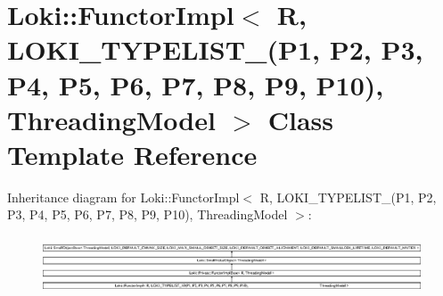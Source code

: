 \hypertarget{classLoki_1_1FunctorImpl_3_01R_00_01LOKI__TYPELIST__10_07P1_00_01P2_00_01P3_00_01P4_00_01P5_00_0411efd7e1763d854e78c97db5e851b87}{}\section{Loki\+:\+:Functor\+Impl$<$ R, L\+O\+K\+I\+\_\+\+T\+Y\+P\+E\+L\+I\+S\+T\+\_(P1, P2, P3, P4, P5, P6, P7, P8, P9, P10), Threading\+Model $>$ Class Template Reference}
\label{classLoki_1_1FunctorImpl_3_01R_00_01LOKI__TYPELIST__10_07P1_00_01P2_00_01P3_00_01P4_00_01P5_00_0411efd7e1763d854e78c97db5e851b87}
Inheritance diagram for Loki\+:\+:Functor\+Impl$<$ R, L\+O\+K\+I\+\_\+\+T\+Y\+P\+E\+L\+I\+S\+T\+\_(P1, P2, P3, P4, P5, P6, P7, P8, P9, P10), Threading\+Model $>$\+:\begin{figure}[H]
\begin{center}
\leavevmode
\includegraphics[height=1.751368cm]{classLoki_1_1FunctorImpl_3_01R_00_01LOKI__TYPELIST__10_07P1_00_01P2_00_01P3_00_01P4_00_01P5_00_0411efd7e1763d854e78c97db5e851b87}
\end{center}
\end{figure}
